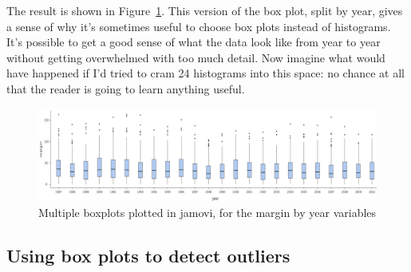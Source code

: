 \documentclass[
  a4paper,
]{book}
\begin{document}
The result is shown in Figure~\ref{fig-fig5-7}. This version of the box
plot, split by year, gives a sense of why it's sometimes useful to
choose box plots instead of histograms. It's possible to get a good
sense of what the data look like from year to year without getting
overwhelmed with too much detail. Now imagine what would have happened
if I'd tried to cram 24 histograms into this space: no chance at all
that the reader is going to learn anything useful.

\begin{figure}

\includegraphics[width=1\textwidth,height=\textheight]{images/fig5-7.png} \hfill{}

\caption{\label{fig-fig5-7}Multiple boxplots plotted in jamovi, for the
margin by year variables}

\end{figure}

\hypertarget{sec-Using-box-plots-to-detect-outliers}{%
\subsection{Using box plots to detect
outliers}\label{sec-Using-box-plots-to-detect-outliers}}
\end{document}
